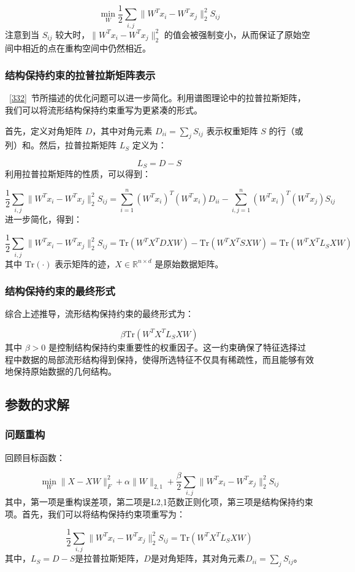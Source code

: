 \documentclass[12pt,a4paper,UTF8]{article}
\begin{document}
 $$
 \min_W \frac{1}{2}\sum_{i,j}\|W^Tx_i - W^Tx_j\|^2_2 S_{ij}
 $$
 注意到当 $S_{ij}$ 较大时，$\|W^Tx_i - W^Tx_j\|^2_2$ 的值会被强制变小，从而保证了原始空间中相近的点在重构空间中仍然相近。
 
 \subsubsection{结构保持约束的拉普拉斯矩阵表示}
 ~\ref{332}~节所描述的优化问题可以进一步简化。利用谱图理论中的拉普拉斯矩阵，我们可以将流形结构保持约束重写为更紧凑的形式。
 
 首先，定义对角矩阵 $D$，其中对角元素 $D_{ii} = \sum_j S_{ij}$ 表示权重矩阵 $S$ 的行（或列）和。然后，拉普拉斯矩阵 $L_S$ 定义为：
 
 $$
 L_S = D - S
 $$
 利用拉普拉斯矩阵的性质，可以得到：
 
 $$
 \frac{1}{2}\sum_{i,j}\|W^Tx_i - W^Tx_j\|^2_2 S_{ij} = \sum_{i=1}^{n}(W^Tx_i)^T(W^Tx_i)D_{ii} - \sum_{i,j=1}^{n}(W^Tx_i)^T(W^Tx_j)S_{ij}
 $$
 进一步简化，得到：
 
 $$
 \frac{1}{2}\sum_{i,j}\|W^Tx_i - W^Tx_j\|^2_2 S_{ij} = \text{Tr}(W^TX^TDXW) - \text{Tr}(W^TX^TSXW) = \text{Tr}(W^TX^TL_SXW)
 $$
 其中 $\text{Tr}(\cdot)$ 表示矩阵的迹，$X \in \mathbb{R}^{n \times d}$ 是原始数据矩阵。
 
 \subsubsection{结构保持约束的最终形式}
 综合上述推导，流形结构保持约束的最终形式为：
 
 $$
 \beta\text{Tr}(W^TX^TL_SXW)
 $$
 其中 $\beta > 0$ 是控制结构保持约束重要性的权重因子。这一约束确保了特征选择过程中数据的局部流形结构得到保持，使得所选特征不仅具有稀疏性，而且能够有效地保持原始数据的几何结构。
 
 \subsection{参数的求解}
 \subsubsection{问题重构}
 回顾目标函数：
 
 $$
 \min_W \|X - XW\|_F^2 + \alpha\|W\|_{2,1} + \frac{\beta}{2}\sum_{i,j}\|W^Tx_i - W^Tx_j\|_2^2 S_{ij}
 $$
 其中，第一项是重构误差项，第二项是L2,1范数正则化项，第三项是结构保持约束项。首先，我们可以将结构保持约束项重写为：
 
 $$
 \frac{1}{2}\sum_{i,j}\|W^Tx_i - W^Tx_j\|_2^2 S_{ij} = \text{Tr}(W^TX^TL_SXW)
 $$
 其中，$L_S = D - S$是拉普拉斯矩阵，$D$是对角矩阵，其对角元素$D_{ii} = \sum_j S_{ij}$。
 
\end{document}

